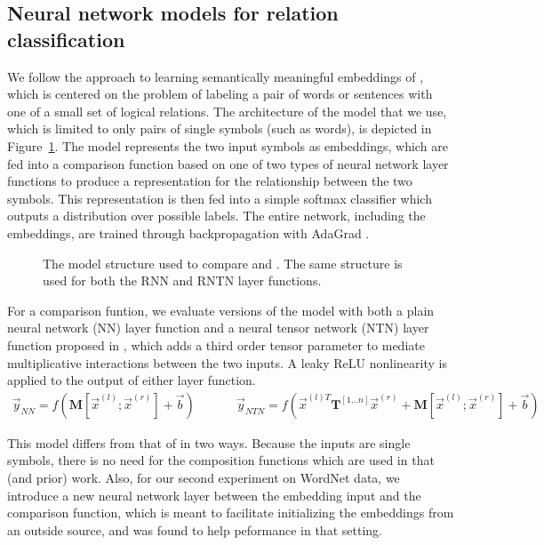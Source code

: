 
\subsection*{Neural network models for relation classification} \label{methods}


We follow the approach to learning semantically meaningful embeddings 
of \cite{Bowman:Potts:Manning:2014}, which is centered on the problem of
labeling a pair of words or sentences with one of a small set of logical
relations. The architecture of the model that we use, which is limited
to only pairs of single symbols (such as words), is depicted in
Figure~\ref{sample-figure}. The model represents the two input symbols
as embeddings, which are fed into a comparison function based on one
of two types of neural network layer functions to produce a representation
for the relationship between the two symbols. This representation is then
fed into a simple softmax classifier which outputs a distribution over
possible labels. The entire network, including the embeddings, are trained
through backpropagation with AdaGrad \cite{duchi2011adaptive}.

\begin{figure}[tp]
  \centering
  
  \caption{The model structure used to compare  and . 
    The same structure is used for both the RNN and RNTN layer functions.} 
  \label{sample-figure}
\end{figure}


For a comparison funtion, we evaluate versions of the model with both a plain neural
network (NN) layer function and a neural tensor network (NTN) layer function
proposed in \citet{chen2013learning}, which adds a third order tensor parameter
to mediate multiplicative interactions between the two inputs. A leaky ReLU
nonlinearity \cite{maasrectifier} is applied to the output of either
layer function.
%
\begin{gather} \label{rnn}
\vec{y}_{\textit{NN}} = f(\mathbf{M} [\vec{x}^{(l)}; \vec{x}^{(r)}] + \vec{b}) ~~~~~~~~~~~~~~~ \vec{y}_{\textit{NTN}} = f(\vec{x}^{(l)T} \mathbf{T}^{[1 \ldots n]} \vec{x}^{(r)} + \mathbf{M} [\vec{x}^{(l)}; \vec{x}^{(r)}] + \vec{b})
\end{gather} 
%

This model differs from that of \citet{Bowman:Potts:Manning:2014} in two ways. Because 
the inputs are single symbols, there is no need for the composition functions
which are used in that (and prior) work. Also, for our second experiment on 
WordNet data, we introduce a new neural network layer between the embedding input
and the comparison function, which is meant to facilitate initializing the embeddings
from an outside source, and was found to help peformance in that setting.


